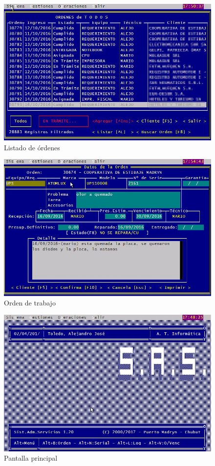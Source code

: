 \documentclass[12pt]{extarticle}
\begin{document}
\begin{figure}[h]
\includegraphics[scale=0.5]{images/listado_ordenes.jpg}
\caption{Listado de órdenes}
\end{figure}

\begin{figure}[h]
\includegraphics[scale=0.5]{images/orden.jpg}
\caption{Orden de trabajo}
\end{figure}

\begin{figure}[h]
\includegraphics[scale=0.5]{images/pantalla_principal.jpg}
\caption{Pantalla principal}
\end{figure}
\end{document}
